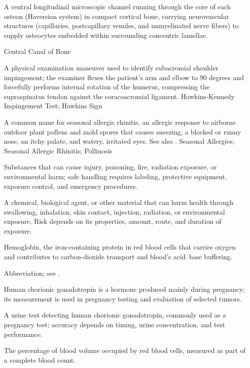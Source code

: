  A central longitudinal microscopic channel running through the core of each osteon (Haversian system) in compact cortical bone, carrying neurovascular structures (capillaries, postcapillary venules, and unmyelinated nerve fibers) to supply osteocytes embedded within surrounding concentric lamellae.

\synonyms
Central Canal of Bone

 A physical examination maneuver used to identify subacromial shoulder impingement; the examiner flexes the patient's arm and elbow to 90 degrees and forcefully performs internal rotation of the humerus, compressing the supraspinatus tendon against the coracoacromial ligament.
\synonyms
Hawkins-Kennedy Impingement Test; Hawkins Sign

 A common name for seasonal allergic rhinitis, an allergic response to airborne outdoor plant pollens and mold spores that causes sneezing, a blocked or runny nose, an itchy palate, and watery, irritated eyes. See also .
\synonyms
Seasonal Allergies; Seasonal Allergic Rhinitis; Pollinosis

 Substances that can cause injury, poisoning, fire, radiation exposure, or environmental harm; safe handling requires labeling, protective equipment, exposure control, and emergency procedures.

 A chemical, biological agent, or other material that can harm health through swallowing, inhalation, skin contact, injection, radiation, or environmental exposure. Risk depends on its properties, amount, route, and duration of exposure.

 Hemoglobin, the iron-containing protein in red blood cells that carries oxygen and contributes to carbon-dioxide transport and blood's acid--base buffering.

 Abbreviation; see .

 Human chorionic gonadotropin is a hormone produced mainly during pregnancy; its measurement is used in pregnancy testing and evaluation of selected tumors.

 A urine test detecting human chorionic gonadotropin, commonly used as a pregnancy test; accuracy depends on timing, urine concentration, and test performance.

 The percentage of blood volume occupied by red blood cells, measured as part of a complete blood count.

